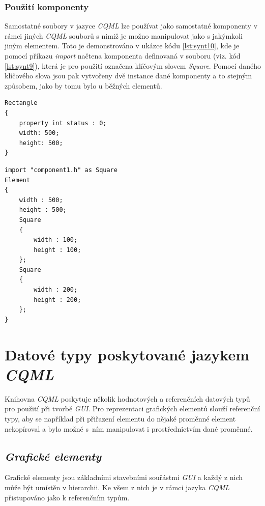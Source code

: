 \documentclass[11pt,twoside,a4paper]{book}
\begin{document}
\subsection{Použití komponenty}
Samostatné soubory v jazyce \textit{CQML} lze používat jako samostatné komponenty v rámci jiných \textit{CQML} souborů s nimiž je možno manipulovat jako s jakýmkoli jiným elementem. Toto je demonstrováno v ukázce kódu \ref{lst:synt10}, kde je pomocí příkazu \textit{import} načtena komponenta definovaná v souboru  (viz. kód \ref{lst:synt9}), která je pro použití označena klíčovým slovem \textit{Square}. Pomocí daného klíčového slova jsou pak vytvořeny dvě instance dané komponenty a to stejným způsobem, jako by tomu bylo u běžných elementů.
\begin{lstlisting}[frame=single,caption=Zdrojový soubor komponenty.,label=lst:synt9]
Rectangle
{
	property int status : 0;
	width: 500;
	height: 500;
}
\end{lstlisting}


\begin{lstlisting}[frame=single,caption=Ukázka použití komponenty z jiného souboru.,label=lst:synt10]
import "component1.h" as Square
Element
{
	width : 500;
	height : 500;
	Square
	{
		width : 100;
		height : 100;
	};
	Square
	{
		width : 200;
		height : 200;
	};
}
\end{lstlisting}



\chapter[Datové typy \textit{CQML}]{\label{CH:APC}Datové typy poskytované jazykem \textit{CQML}}
Knihovna \textit{CQML} poskytuje několik hodnotových a referenčních datových typů pro použití při tvorbě \textit{GUI}. Pro reprezentaci grafických elementů slouží referenční typy, aby se například při přiřazení elementu do nějaké proměnné element nekopíroval a bylo možné s~ním manipulovat i prostřednictvím dané proměnné.
\section{\textit{Grafické elementy}}
Grafické elementy jsou základními stavebními souřástmi \textit{GUI} a každý z nich může být umístěn v hierarchii. Ke všem z nich je v rámci jazyka \textit{CQML} přistupováno jako k referenčním typům.
\end{document}
